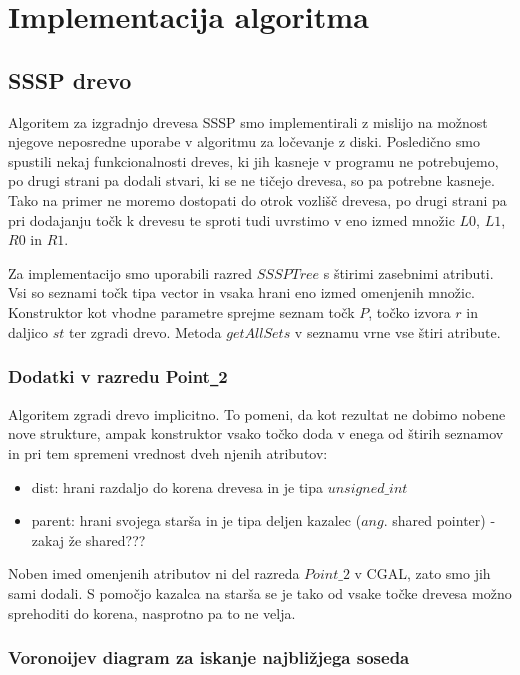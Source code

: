 \documentclass[a4paper, 12pt]{book}
\begin{document}
\chapter{Implementacija algoritma}
\label{ch3}


\section{SSSP drevo}

Algoritem za izgradnjo drevesa SSSP smo implementirali z mislijo na možnost njegove neposredne uporabe v algoritmu za ločevanje z diski. Posledično smo spustili nekaj funkcionalnosti dreves, ki jih kasneje v programu ne potrebujemo, po drugi strani pa dodali stvari, ki se ne tičejo drevesa, so pa potrebne kasneje. Tako na primer ne moremo dostopati do otrok vozlišč drevesa, po drugi strani pa pri dodajanju točk k drevesu te sproti tudi uvrstimo v eno izmed množic $L0$, $L1$, $R0$ in $R1$.

Za implementacijo smo uporabili razred $SSSPTree$ s štirimi zasebnimi atributi. Vsi so seznami točk tipa vector in vsaka hrani eno izmed omenjenih množic. Konstruktor kot vhodne parametre sprejme seznam točk $P$, točko izvora $r$ in daljico $st$ ter zgradi drevo. Metoda $getAllSets$ v seznamu vrne vse štiri atribute.

\subsection{Dodatki v razredu Point\texttt{\_}2}
Algoritem zgradi drevo implicitno. To pomeni, da kot rezultat ne dobimo nobene nove strukture, ampak konstruktor vsako točko doda v enega od štirih seznamov in pri tem spremeni vrednost dveh njenih atributov:

\begin{itemize}
\item dist: hrani razdaljo do korena drevesa in je tipa $unsigned\texttt{\_}int$
\item parent: hrani svojega starša in je tipa deljen kazalec ($ang.$ shared pointer) - zakaj že shared???
\end{itemize}

Noben imed omenjenih atributov ni del razreda $Point\texttt{\_}2$ v CGAL, zato smo jih sami dodali. S pomočjo kazalca na starša se je tako od vsake točke drevesa možno sprehoditi do korena, nasprotno pa to ne velja.

\subsection{Voronoijev diagram za iskanje najbližjega soseda}
\end{document}
